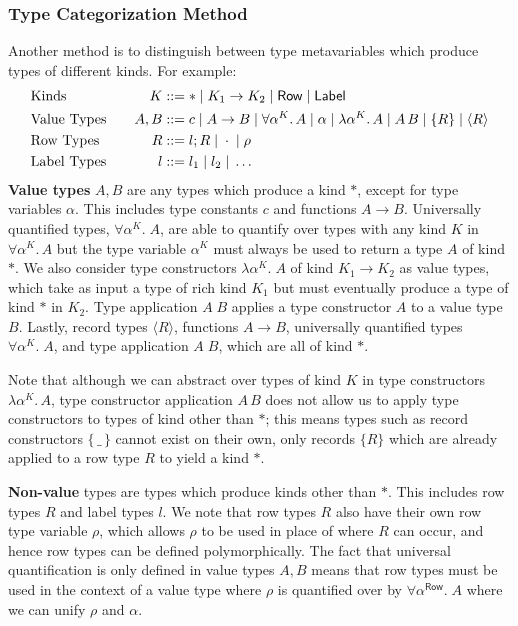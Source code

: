 \documentclass[acmsmall, 9pt]{article}
\begin{document}
\subsubsection{Type Categorization Method}
\label{sssec:type-categorization-method}
Another method is to distinguish between type metavariables which produce types of different kinds. For example:
\begin{align*}
&\text{Kinds} \quad &K &::= * \; | \; K_1 \rightarrow K_2 \; | \; \mathsf{Row} \; | \; \mathsf{Label}\\
&\text{Value Types} \quad  &A, B &::= c \; | \; A \rightarrow B \; | \; \forall \alpha^K . \, A\; | \; \alpha \; | \; \lambda \alpha^K. \, A \; | \; A \, B \; | \; \{ R \} \; | \; \langle R \rangle\\
&\text{Row Types} \quad &R &::= l; R \; | \; \cdot \; | \; \rho \\
&\text{Label Types} \quad &l &::= l_1 \; | \; l_2 \; | \; \ldots
\end{align*}
\textbf{Value types} $A,B$ are any types which produce a kind $*$, except for type variables $\alpha$. This includes type constants $c$ and functions $A \rightarrow B$. Universally quantified types, $\forall \alpha^K . \; A$, are able to quantify over types with any kind $K$ in $\forall \alpha^K. \, A$ but the type variable $\alpha^K$ must always be used to return a type $A$ of kind $*$. We also consider type constructors $\lambda \alpha^K. \; A$ of kind $K_1 \rightarrow K_2$ as value types, which take as input a type of rich kind $K_1$ but must eventually produce a type of kind $*$ in $K_2$. Type application $A\;B$ applies a type constructor $A$ to a value type $B$. Lastly, record types $\langle R \rangle$, functions $A \rightarrow B$, universally quantified types $\forall \alpha^K . \; A$, and type application $A\;B$, which are all of kind $*$.

Note that although we can abstract over types of kind $K$ in type constructors $\lambda \alpha^K. \, A$, type constructor application $A\,B$ does not allow us to apply type constructors to types of kind other than $*$; this means types such as record constructors $\{ \, \_ \, \}$ cannot exist on their own, only records $\{ R \}$ which are already applied to a row type $R$ to yield a kind $*$.

\lbreak
\textbf{Non-value} types are types which produce kinds other than $*$. This includes row types $R$ and label types $l$. We note that row types $R$ also have their own row type variable $\rho$, which allows $\rho$ to be used in place of where $R$ can occur, and hence row types can be defined polymorphically. The fact that universal quantification is only defined in value types $A, B$ means that row types must be used in the context of a value type where $\rho$ is quantified over by $\forall \alpha^\mathsf{Row} . \; A$ where we can unify $\rho$ and $\alpha$.
\end{document}
